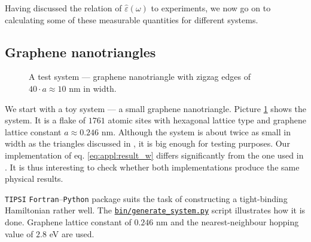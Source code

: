 \documentclass[a4paper,12pt]{article}
\begin{document}
    Having discussed the relation of $\hat\varepsilon(\omega)$ to experiments, we now go on to calculating some of these measurable quantities for different systems.

\newpage
\subsection{Graphene nanotriangles}
\label{sec:nanotriangles}
    \begin{figure}
        \center
        \vspace{-1.3cm}
        
        \captionsetup{width=0.4\textwidth, skip=10pt}
        \caption{A test system --- graphene nanotriangle with zigzag edges of $40\cdot a \approx 10$ nm in width.}
        \label{fig:coordinates-ZigZag-40}
    \end{figure}
    We start with a toy system --- a small graphene nanotriangle. Picture \ref{fig:coordinates-ZigZag-40} shows the system. It is a flake of $1761$ atomic sites with hexagonal lattice type and graphene lattice constant $a \approx 0.246$ nm. Although the system is about twice as small in width as the triangles discussed in \cite{plasmonic2015}, it is big enough for testing purposes. Our implementation of eq. \eqref{eq:appl:result_w} differs significantly from the one used in \cite{plasmonic2015}. It is thus interesting to check whether both implementations produce the same physical results.

    \texttt{TIPSI} \texttt{Fortran}--\texttt{Python} package \cite{tipsi} suits the task of constructing a tight-binding Hamiltonian rather well. The \hyperref[code]{\texttt{bin/generate\_system.py}} script illustrates how it is done. Graphene lattice constant of $0.246$ nm and the nearest-neighbour hopping value of $2.8$ eV are used.

    \begin{figure}[h]
    \vspace{-0.3cm}
    \begin{minipage}{\textwidth}
        
        \captionsetup{skip=5pt}
        \label{fig:spectrum-ZigZag-40}
    \end{minipage}
    \begin{minipage}{\textwidth}
        \vspace{-1.0cm}
        
        \captionsetup{skip=0pt}
        \label{fig:eigenmodes-ZigZag-40}
    \end{minipage}
    \end{figure}
\end{document}
